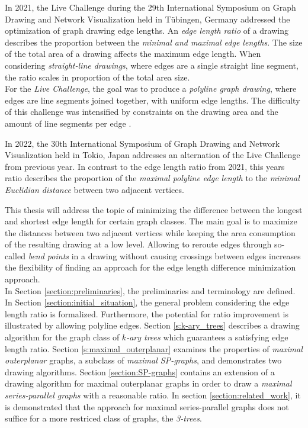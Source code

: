 \bigskip

In 2021, the Live Challenge during the 29th International Symposium on Graph Drawing and Network Visualization held in Tübingen, Germany addressed the optimization of graph drawing edge lengths. An \emph{edge length ratio} of a drawing describes the proportion between the \emph{minimal and maximal edge lengths}. The size of the total area of a drawing affects the maximum edge length. When considering \emph{straight-line drawings}, where edges are a single straight line segment, the ratio scales in proportion of the total area size.\\
For the \emph{Live Challenge}, the goal was to produce a \emph{polyline graph drawing}, where edges are line segments joined together, with uniform edge lengths. 
The difficulty of this challenge was intensified by constraints on the drawing area and the amount of line segments per edge \cite{GD:2021_Challenge}.

\bigskip


In 2022, the 30th International Symposium of Graph Drawing and Network Visualization held in Tokio, Japan \cite{GD:2022_Challenge} addresses an alternation of the Live Challenge from previous year. In contrast to the edge length ratio from 2021, this years ratio describes the proportion of the \emph{maximal polyline edge length} to the \emph{minimal Euclidian distance} between two adjacent vertices. 

\bigskip


This thesis will address the topic of minimizing the difference between the longest and shortest edge length for certain graph classes. The main goal is to maximize the distances between two adjacent vertices while keeping the area consumption of the resulting drawing at a low level. Allowing to reroute edges through so-called \emph{bend points} in a drawing without causing crossings between edges increases the flexibility of finding an approach for the edge length difference minimization approach.\\
In Section \ref{section:preliminaries}, the preliminaries and terminology are defined. 
In Section \ref{section:initial_situation}, the general problem considering the edge length ratio is formalized. Furthermore, the potential for ratio improvement is illustrated by allowing polyline edges. 
Section \ref{s:k-ary_trees} describes a drawing algorithm for the graph class of \emph{$k$-ary trees} which guarantees a satisfying edge length ratio.
Section \ref{s:maximal_outerplanar} examines the properties of \emph{maximal outerplanar} graphs, a subclass of \emph{maximal SP-graphs}, and demonstrates two drawing algorithms.
Section \ref{section:SP-graphs} contains an extension of a drawing algorithm for maximal outerplanar graphs in order to draw a \emph{maximal series-parallel graphs} with a reasonable ratio. 
In section \ref{section:related_work}, it is demonstrated that the approach for maximal series-parallel graphs does not suffice for a more restriced class of graphs, the \emph{3-trees}.
